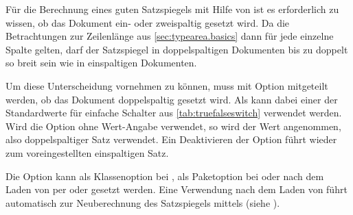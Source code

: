 \begin{Declaration}
\end{Declaration}%
Für die Berechnung eines guten Satzspiegels mit Hilfe von
 ist es erforderlich zu wissen, ob das
Dokument ein- oder zweispaltig gesetzt wird. Da die Betrachtungen zur
Zeilenlänge aus \autoref{sec:typearea.basics} dann für jede einzelne Spalte
gelten, darf der Satzspiegel in doppelspaltigen Dokumenten bis zu doppelt so
breit sein wie in einspaltigen Dokumenten.

Um diese Unterscheidung vornehmen zu können, muss  mit
Option  mitgeteilt werden, ob das Dokument doppelspaltig
gesetzt wird. Als  kann dabei einer der Standardwerte für
einfache Schalter aus \autoref{tab:truefalseswitch} verwendet werden. Wird die
Option ohne Wert-Angabe verwendet, so wird der Wert
 angenommen, also
doppelspaltiger Satz verwendet. Ein
Deaktivieren der Option führt wieder zum voreingestellten
einspaltigen Satz.

Die Option kann als Klassenoption bei ,
als Paketoption bei  oder nach dem Laden
von  per  oder
 gesetzt werden. Eine Verwendung %
\iffalse %
dieser Option \fi%
nach dem Laden von 
führt automatisch zur Neuberechnung des
Satzspiegels mittels  (siehe
).%
%
\EndIndexGroup


